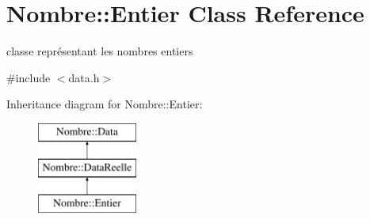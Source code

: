 \hypertarget{classNombre_1_1Entier}{
\section{Nombre::Entier Class Reference}
\label{classNombre_1_1Entier}
}


classe représentant les nombres entiers  




{\ttfamily \#include $<$data.h$>$}

Inheritance diagram for Nombre::Entier:\begin{figure}[H]
\begin{center}
\leavevmode
\includegraphics[height=3cm]{classNombre_1_1Entier}
\end{center}
\end{figure}
